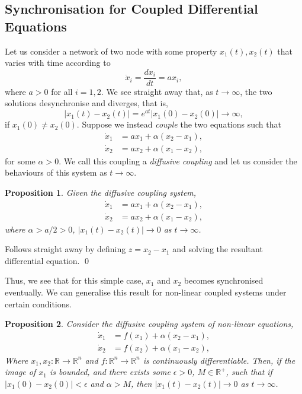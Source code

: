 \documentclass[
]{article}
\newtheorem{prop}{Proposition}[theorem]
\theoremstyle{definition}
\begin{document}
\hypertarget{synchronisation-for-coupled-differential-equations}{%
\subsection{Synchronisation for Coupled Differential
Equations}\label{synchronisation-for-coupled-differential-equations}}

Let us consider a network of two node with some property
\(x_1(t), x_2(t)\) that varies with time according to
\[\dot x_i = \frac{dx_i}{dt} = ax_i,\] where \(a > 0\) for all
\(i = 1, 2\). We see straight away that, as \(t \to \infty\), the two
solutions desynchronise and diverges, that is,
\[\left| x_1(t) - x_2(t) \right| = e^{at} \left| x_1(0) - x_2(0) \right| \to \infty,\]
if \(x_1(0) \neq x_2(0)\). Suppose we instead \emph{couple} the two
equations such that \begin{align*}
  \dot x_1 & = ax_1 + \alpha(x_2 - x_1),\\
  \dot x_2 & = ax_2 + \alpha(x_1 - x_2),
\end{align*} for some \(\alpha > 0\). We call this coupling a
\emph{diffusive coupling} and let us consider the behaviours of this
system as \(t \to \infty\).

\begin{prop}
  Given the diffusive coupling system, 
  \begin{align*}
    \dot x_1 & = ax_1 + \alpha(x_2 - x_1),\\
    \dot x_2 & = ax_2 + \alpha(x_1 - x_2),
  \end{align*}
  where \(\alpha > a / 2 > 0\), \(\left| x_1(t) - x_2(t) \right| \to 0\) as 
  \(t \to \infty\).
\end{prop}
\proof

Follows straight away by defining \(z = x_2 - x_1\) and solving the
resultant differential equation. \qed

Thus, we see that for this simple case, \(x_1\) and \(x_2\) becomes
synchronised eventually. We can generalise this result for non-linear
coupled systems under certain conditions.

\begin{prop}
  Consider the diffusive coupling system of non-linear equations,
  \begin{align*}
    \dot x_1 & = f(x_1) + \alpha (x_2 - x_1),\\
    \dot x_2 & = f(x_2) + \alpha (x_1 - x_2),
  \end{align*}
  Where \(x_1, x_2 : \mathbb{R} \to \mathbb{R}^n\) and 
  \(f : \mathbb{R}^n \to \mathbb{R}^n\) is continuously differentiable.
  Then, if the image of \(x_1\) is bounded, and there exists some 
  \(\epsilon > 0\), \(M \in \mathbb{R}^+\), such that if 
  \(\left| x_1(0) - x_2(0) \right| < \epsilon\) and \(\alpha > M\), then 
  \(\left| x_1(t) - x_2(t) \right| \to 0\) as \(t \to \infty\).
\end{prop}
\proof
\end{document}
